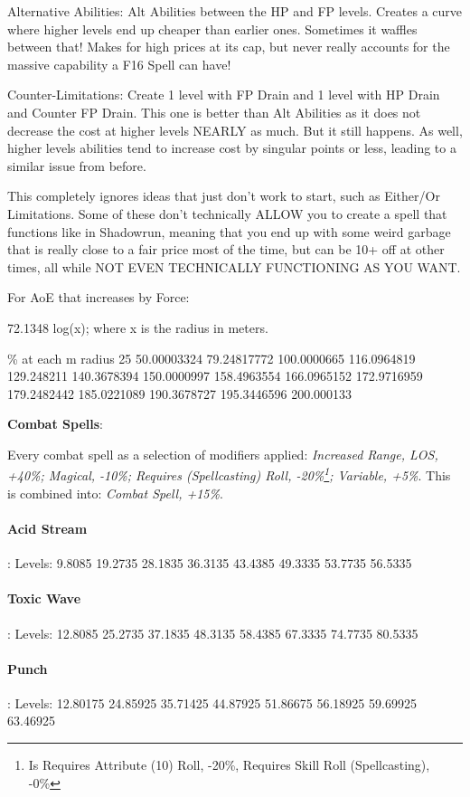 \begin{multicols*}{2}
	Alternative Abilities: Alt Abilities between the HP and FP levels. Creates a curve where higher levels end up cheaper than earlier ones. Sometimes it waffles between that! Makes for high prices at its cap, but never really accounts for the massive capability a F16 Spell can have!
	
	Counter-Limitations: Create 1 level with FP Drain and 1 level with HP Drain and Counter FP Drain. This one is better than Alt Abilities as it does not decrease the cost at higher levels NEARLY as much. But it still happens. As well, higher levels abilities tend to increase cost by singular points or less, leading to a similar issue from before.
	
	This completely ignores ideas that just don't work to start, such as Either/Or Limitations. Some of these don't technically ALLOW you to create a spell that functions like in Shadowrun, meaning that you end up with some weird garbage that is really close to a fair price most of the time, but can be 10+ off at other times, all while NOT EVEN TECHNICALLY FUNCTIONING AS YOU WANT.
	
	For AoE that increases by Force:
	
	72.1348 log(x); where x is the radius in meters.
	
	
	\% at each m radius
	25
	50.00003324
	79.24817772
	100.0000665
	116.0964819
	129.248211
	140.3678394
	150.0000997
	158.4963554
	166.0965152
	172.9716959
	179.2482442
	185.0221089
	190.3678727
	195.3446596
	200.000133
	
	\textbf{Combat Spells}:
	
	Every combat spell as a selection of modifiers applied: \textit{Increased Range, LOS, +40\%; Magical, -10\%; Requires (Spellcasting) Roll, -20\%\footnote{Is Requires Attribute (10) Roll, -20\%, Requires Skill Roll (Spellcasting), -0\%}; Variable, +5\%}. This is combined into: \textit{Combat Spell, +15\%}.
	
	\paragraph{Acid Stream}: Levels: 9.8085 19.2735 28.1835 36.3135 43.4385 49.3335 53.7735 56.5335
	
	\paragraph{Toxic Wave}: Levels: 12.8085 25.2735 37.1835 48.3135 58.4385 67.3335 74.7735 80.5335
	
	\paragraph{Punch}: Levels: 12.80175 24.85925 35.71425 44.87925 51.86675 56.18925 59.69925 63.46925
	

\end{multicols*}

